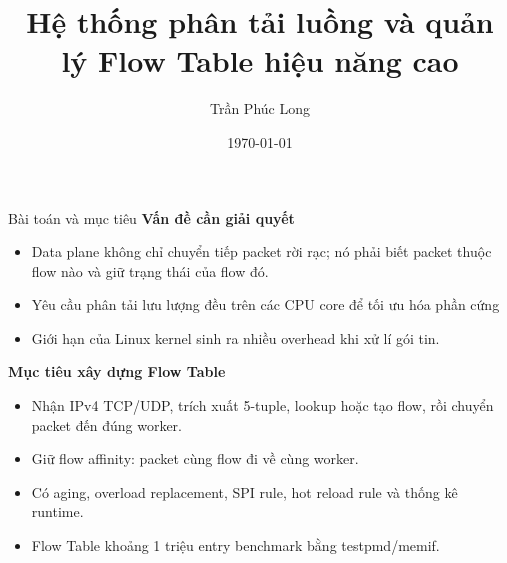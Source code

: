 \documentclass[aspectratio=169]{beamer}
\title[Flow Table DPDK]{Hệ thống phân tải luồng và quản lý Flow Table hiệu năng cao}
\author{Trần Phúc Long}
\institute{VDT 2026}
\date{\today}
\begin{document}
\frame{\titlepage}

\begin{frame}{Bài toán và mục tiêu}
\small
\textbf{Vấn đề cần giải quyết}
\begin{itemize}
    \item Data plane không chỉ chuyển tiếp packet rời rạc; nó phải biết packet thuộc flow nào và giữ trạng thái của flow đó.
    \item Yêu cầu phân tải lưu lượng đều trên các CPU core để tối ưu hóa phần cứng
    \item Giới hạn của Linux kernel sinh ra nhiều overhead khi xử lí gói tin. 
\end{itemize}

\vspace{0.15cm}
\textbf{Mục tiêu xây dựng Flow Table}
\begin{itemize}
    \item Nhận IPv4 TCP/UDP, trích xuất 5-tuple, lookup hoặc tạo flow, rồi chuyển packet đến đúng worker.
    \item Giữ flow affinity: packet cùng flow đi về cùng worker.
    \item Có aging, overload replacement, SPI rule, hot reload rule và thống kê runtime.
    \item Flow Table khoảng 1 triệu entry benchmark bằng testpmd/memif.
\end{itemize}
\end{frame}
\end{document}

